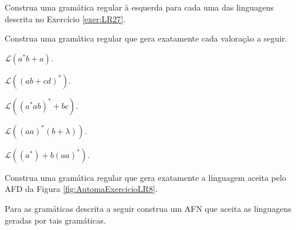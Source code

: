 \begin{questao}\label{exer:EGR47}
	Construa uma gramática regular à esquerda para cada uma das linguagens descrita no Exercício \ref{exer:LR27}.
\end{questao}

\begin{questao}\label{exer:EGR48}
	Construa uma gramática regular que gera exatamente cada valoração a seguir.
\end{questao}

\begin{exerList}
	\item $\mathcal{L}(a^*b + a)$.
	\item $\mathcal{L}((ab + cd)^*)$.
	\item $\mathcal{L}((a^*ab)^* + bc)$.
	\item $\mathcal{L}((aa)^* (b + \lambda))$.
	\item $\mathcal{L}((a^*) + b(aa)^*)$.
\end{exerList}

\begin{questao}\label{exer:EGR49}
	Construa uma gramática regular que gera exatamente a linguagem aceita pelo AFD da Figura \ref{fig:AutomaExercicioLR8}. 
\end{questao}

\begin{questao}\label{exer:EGR50}
	Para as gramáticas descrita a seguir construa um AFN que aceita as linguagens geradas por tais gramáticas. 
\end{questao}

